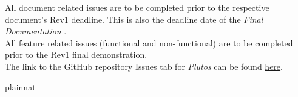 \documentclass[12pt, titlepage]{article}
\begin{document}
\noindent All document related issues are to be completed prior to the respective document's Rev1 deadline. This is also the deadline date of the \textit{Final Documentation} . \\

\noindent All feature related issues (functional and non-functional) are to be completed prior to the Rev1 final demonstration. \\

\noindent The link to the GitHub repository Issues tab for \textit{Plutos} can be found \href{https://github.com/PlutosCapstone/Plutos/issues}{here}.

 {plainnat}


\newpage{}
\end{document}
